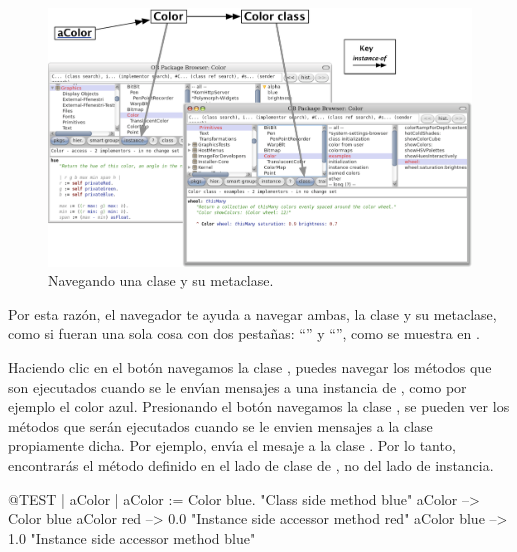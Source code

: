 \documentclass[a4paper,10pt,twoside]{book}
\begin{document}
\begin{figure}[htb]
\begin{center}
\includegraphics[width=\textwidth]{Color-Buttons}
\caption{Navegando una clase y su metaclase.
}
\end{center}
\end{figure}

Por esta raz\'on, el navegador   te ayuda a navegar ambas, la clase y su metaclase, como si fueran una sola cosa con dos pesta\~nas: ``'' y ``'', como se muestra en . 

Haciendo clic en el bot\'on  navegamos la clase , \ie puedes navegar los m\'etodos que son ejecutados cuando se le env\'\i{}an mensajes a una instancia de , como por ejemplo el color azul. Presionando el bot\'on   navegamos la clase , \ie se pueden ver los m\'etodos que ser\'an ejecutados cuando se le envien mensajes a la clase   propiamente dicha.
Por ejemplo,  env\'\i{}a el mesaje  a la clase . Por lo tanto, encontrar\'as el m\'etodo   definido en el lado de clase de  , no del lado de instancia. 


\begin{code}{@TEST | aColor |}
aColor := Color blue.               "Class side method blue"
aColor        --> Color blue
aColor red  --> 0.0         "Instance side accessor method red"
aColor blue --> 1.0        "Instance side accessor method blue"
\end{code}
\end{document}
